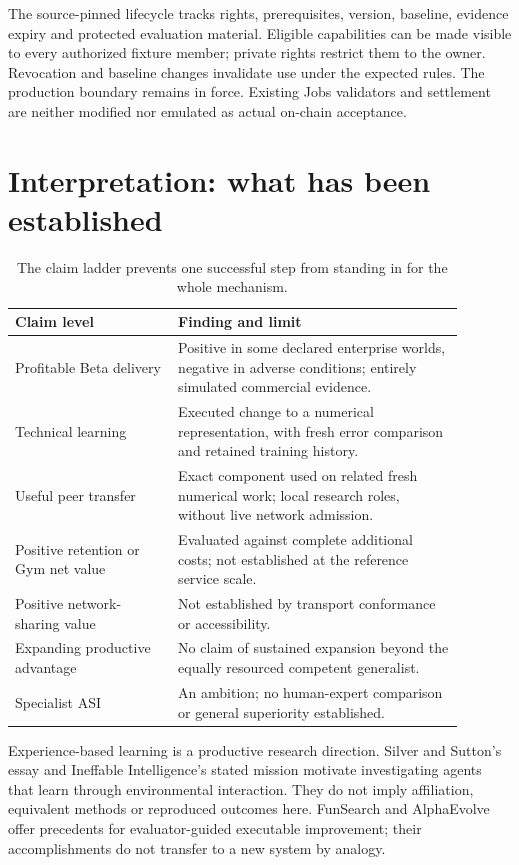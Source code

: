 \documentclass[11pt,letterpaper]{article}
\begin{document}
The source-pinned lifecycle tracks rights, prerequisites, version, baseline, evidence expiry and protected evaluation material. Eligible capabilities can be made visible to every authorized fixture member; private rights restrict them to the owner. Revocation and baseline changes invalidate use under the expected rules. The production boundary remains in force. Existing Jobs validators and settlement are neither modified nor emulated as actual on-chain acceptance.

\section{Interpretation: what has been established}

\begin{table}[htbp]\centering\small
\begin{tabular}{p{0.32\linewidth}p{0.57\linewidth}}
\toprule Claim level & Finding and limit \\
\midrule
Profitable Beta delivery & Positive in some declared enterprise worlds, negative in adverse conditions; entirely simulated commercial evidence. \\
Technical learning & Executed change to a numerical representation, with fresh error comparison and retained training history. \\
Useful peer transfer & Exact component used on related fresh numerical work; local research roles, without live network admission. \\
Positive retention or Gym net value & Evaluated against complete additional costs; not established at the reference service scale. \\
Positive network-sharing value & Not established by transport conformance or accessibility. \\
Expanding productive advantage & No claim of sustained expansion beyond the equally resourced competent generalist. \\
Specialist ASI & An ambition; no human-expert comparison or general superiority established. \\
\bottomrule
\end{tabular}
\caption{The claim ladder prevents one successful step from standing in for the whole mechanism.}
\end{table}

Experience-based learning is a productive research direction. Silver and Sutton's essay and Ineffable Intelligence's stated mission motivate investigating agents that learn through environmental interaction. They do not imply affiliation, equivalent methods or reproduced outcomes here.\citep{silver_sutton_2025,ineffable_2026} FunSearch and AlphaEvolve offer precedents for evaluator-guided executable improvement; their accomplishments do not transfer to a new system by analogy.\citep{funsearch_2024,alphaevolve_2025}
\end{document}
